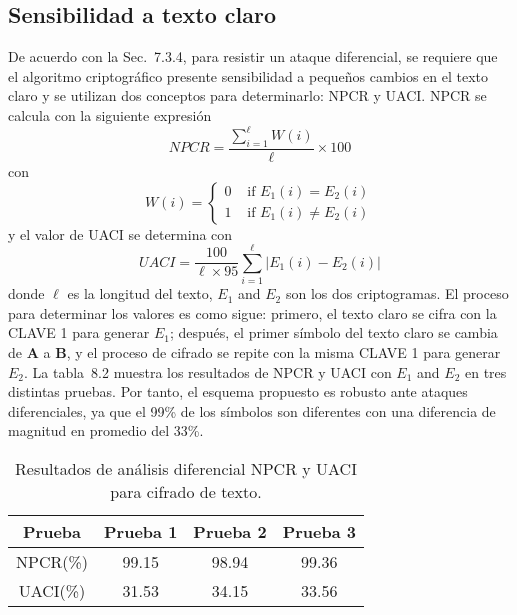 \subsection{Sensibilidad a texto claro}
De acuerdo con la Sec.~7.3.4, para resistir un ataque diferencial, se requiere que el algoritmo criptográfico presente sensibilidad a pequeños cambios en el texto claro y se utilizan dos conceptos para determinarlo: NPCR y UACI. NPCR se calcula con la siguiente expresión
\begin{equation}
NPCR=\frac{\sum_{i=1}^{\ell}W(i)}{\ell} \times 100
\end{equation}
con
\begin{equation}
W(i) = \left\{ \begin{array}{rl}
 0 &\mbox{ if $E_{1}(i)=E_{2}(i)$} \\
 1 &\mbox{ if $E_{1}(i)\neq E_{2}(i)$}
       \end{array} \right.
\end{equation} 
y el valor de UACI se determina con
\begin{equation}
UACI=\frac{100}{\ell \times 95}\sum_{i=1}^{\ell}|E_{1}(i)-E_{2}(i)|
\end{equation}
donde $\ell$ es la longitud del texto, $E_{1}$ and $E_{2}$ son los dos criptogramas. El proceso para determinar los valores es como sigue: primero, el texto claro se cifra con la CLAVE 1 para generar $E_{1}$; después, el primer símbolo del texto claro se cambia de \textbf{A} a \textbf{B}, y el proceso de cifrado se repite con la misma CLAVE 1 para generar $E_{2}$. La tabla~8.2 muestra los resultados de NPCR y UACI con $E_{1}$ and $E_{2}$ en tres distintas pruebas. Por tanto, el esquema propuesto es robusto ante ataques diferenciales, ya que el 99\% de los símbolos son diferentes con una diferencia de magnitud en promedio del 33\%.    

\begin{table}[!htbp] %
	\center
	\begin{tabular}{c c c c} 
	\hline
	Prueba			& 	Prueba 1	&	Prueba 2	&	Prueba 3 \\
	\hline
	NPCR(\%)	& 	99.15	&	98.94	&	99.36		\\
	UACI(\%)	& 	31.53	&	34.15	&	33.56		\\ 	
	\hline
\end{tabular}
	\caption{Resultados de análisis diferencial NPCR y UACI para cifrado de texto.}
\end{table}

